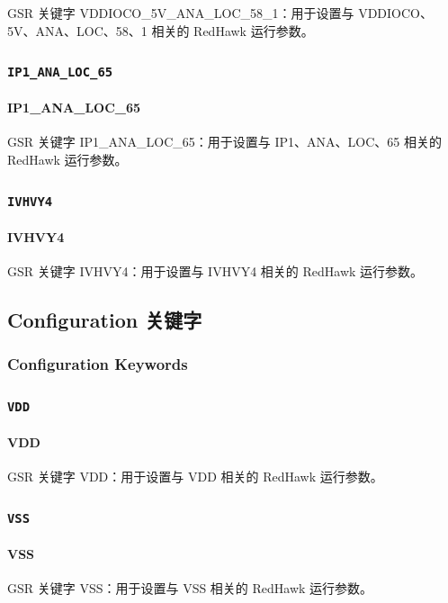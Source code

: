 GSR 关键字 VDDIOCO_5V_ANA_LOC_58_1：用于设置与 VDDIOCO、5V、ANA、LOC、58、1 相关的 RedHawk 运行参数。

\subsubsection{\texttt{IP1_ANA_LOC_65}}
\paragraph*{IP1_ANA_LOC_65}

GSR 关键字 IP1_ANA_LOC_65：用于设置与 IP1、ANA、LOC、65 相关的 RedHawk 运行参数。

\subsubsection{\texttt{IVHVY4}}
\paragraph*{IVHVY4}

GSR 关键字 IVHVY4：用于设置与 IVHVY4 相关的 RedHawk 运行参数。

\subsection{Configuration 关键字}
\subsubsection*{Configuration Keywords}

\subsubsection{\texttt{VDD}}
\paragraph*{VDD}

GSR 关键字 VDD：用于设置与 VDD 相关的 RedHawk 运行参数。

\subsubsection{\texttt{VSS}}
\paragraph*{VSS}

GSR 关键字 VSS：用于设置与 VSS 相关的 RedHawk 运行参数。


